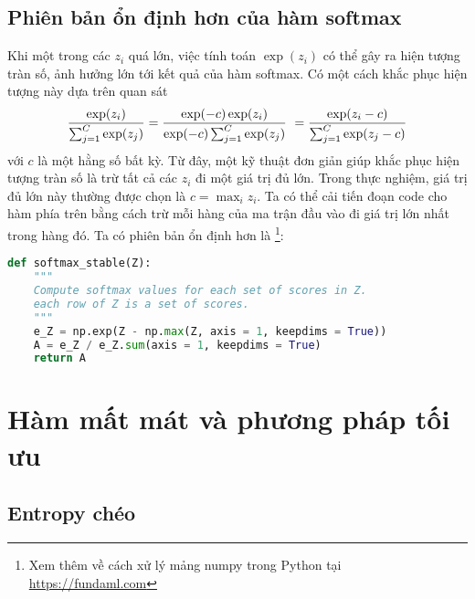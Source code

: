 \subsection{Phiên bản ổn định hơn của hàm softmax}
Khi một trong các $z_i$ quá lớn, việc tính toán $\exp(z_i)$ có thể gây ra hiện
tượng tràn số, ảnh hưởng lớn tới kết quả của hàm
softmax. Có một cách khắc phục hiện tượng này dựa trên quan sát
\begin{equation}
\frac{\exp(z_i)}{\sum_{j=1}^C \exp(z_j)} = \frac{\exp(-c)\exp(z_i)}{\exp(-c)\sum_{j=1}^C \exp(z_j)}\\\
= \frac{\exp(z_i-c)}{\sum_{j=1}^C \exp(z_j-c)}
\end{equation}
với $c$ là một hằng số bất kỳ. Từ đây, một kỹ thuật đơn giản giúp khắc phục hiện
tượng tràn số là trừ tất cả các $z_i$ đi một giá trị đủ lớn. Trong thực nghiệm,
giá trị đủ lớn này thường được chọn là $c = \max_i z_i$. Ta có thể cải tiến
đoạn code cho hàm \pythoninline{softmax} phía trên bằng cách trừ mỗi hàng của
ma trận đầu vào \pythoninline{Z} đi giá trị lớn nhất trong hàng đó. Ta có phiên
bản ổn định hơn là \pythoninline{softmax_stable}\footnote{Xem thêm về
cách xử lý mảng numpy trong Python tại \url{https://fundaml.com}}:
\begin{lstlisting}[language=Python]
def softmax_stable(Z):
    """
    Compute softmax values for each set of scores in Z.
    each row of Z is a set of scores.
    """
    e_Z = np.exp(Z - np.max(Z, axis = 1, keepdims = True))
    A = e_Z / e_Z.sum(axis = 1, keepdims = True)
    return A
\end{lstlisting}






\section{Hàm mất mát và phương pháp tối ưu }


\subsection{Entropy chéo}

